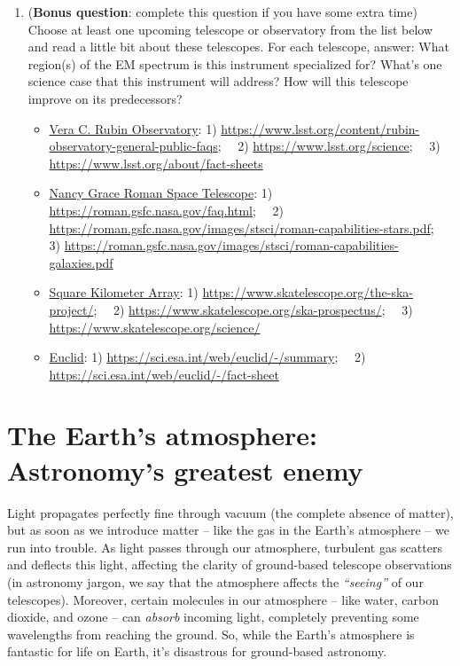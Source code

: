 \documentclass[11pt]{article}
\begin{document}
\begin{enumerate}
    \item (\textbf{Bonus question}: complete this question if you have some extra time)  Choose at least one upcoming telescope or observatory from the list below and read a little bit about these telescopes. For each telescope, answer: What region(s) of the EM spectrum is this instrument specialized for? What's one science case that this instrument will address? How will this telescope improve on its predecessors?
    \begin{itemize}
        \item \underline{Vera C. Rubin Observatory}: 1) \url{https://www.lsst.org/content/rubin-observatory-general-public-faqs}; \, \, 2) \url{https://www.lsst.org/science}; \, \, 3) \url{https://www.lsst.org/about/fact-sheets}
        
        \item \underline{Nancy Grace Roman Space Telescope}: 1) \url{https://roman.gsfc.nasa.gov/faq.html}; \, \, 2) \url{https://roman.gsfc.nasa.gov/images/stsci/roman-capabilities-stars.pdf}; \, \, 3) \url{https://roman.gsfc.nasa.gov/images/stsci/roman-capabilities-galaxies.pdf}
        
        \item \underline{Square Kilometer Array}: 1) \url{https://www.skatelescope.org/the-ska-project/}; \, \, 2) \url{https://www.skatelescope.org/ska-prospectus/}; \, \, 3) \url{https://www.skatelescope.org/science/}
        
        \item \underline{Euclid}: 1) \url{https://sci.esa.int/web/euclid/-/summary}; \, \, 2) \url{https://sci.esa.int/web/euclid/-/fact-sheet}
    \end{itemize}
    
\end{enumerate}

\section{The Earth's atmosphere: Astronomy's greatest enemy}

Light propagates perfectly fine through vacuum (the complete absence of matter), but as soon as we introduce matter -- like the gas in the Earth's atmosphere -- we run into trouble. As light passes through our atmosphere, turbulent gas scatters and deflects this light, affecting the clarity of ground-based telescope observations (in astronomy jargon, we say that the atmosphere affects the \emph{``seeing''} of our telescopes). Moreover, certain molecules in our atmosphere -- like water, carbon dioxide, and ozone -- can \emph{absorb} incoming light, completely preventing some wavelengths from reaching the ground. So, while the Earth's atmosphere is fantastic for life on Earth, it's disastrous for ground-based astronomy.
\end{document}
